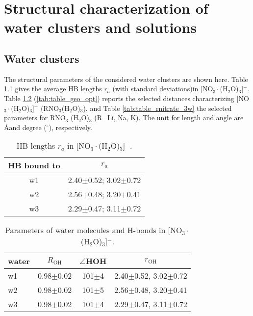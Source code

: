 \chapter{Structural characterization of water clusters and solutions}
\section{Water clusters}\label{structure_of_clusters}
The structural parameters of the considered water clusters are shown here.
Table \ref{tab:3_nitrate_bond_0} gives the average HB lengths $r_a$ (with standard deviations)in [NO$_3\cdot$(H$_2$O)$_3$]$^-$.  
Table \ref{tab:3w_nitrate} (\ref{tab:table_geo_opt}) reports the selected distances characterizing 
[NO$_3\cdot$(H$_2$O)$_3$]$^-$ (RNO$_3$(H$_2$O)$_3$), and Table \ref{tab:table_rnitrate_3w} the selected parameters for RNO$_3$   
 (H$_2$O)$_3$ (R=Li, Na, K).
The unit for length and angle are \AA and degree ($^\circ$), respectively.
% 
\begin{table}[!h]
\centering
\caption{\label{tab:3_nitrate_bond_0}%
HB lengths $r_a$ in [NO$_3\cdot$(H$_2$O)$_3$]$^-$.} %
\begin{tabular}{cc} \\\toprule
 HB bound to & \multicolumn{1}{c}{ $r_a$} \\
\hline
 w1 &2.40$\pm$0.52; 3.02$\pm$0.72 \\
 w2 &2.56$\pm$0.48; 3.20$\pm$0.41 \\
 w3 &2.29$\pm$0.47; 3.11$\pm$0.72
\end{tabular}
\end{table}
%
\begin{table}[!htbp]
\centering
\caption{\label{tab:3w_nitrate}%
Parameters of water molecules and H-bonds in [NO$_3\cdot$(H$_2$O)$_3$]$^-$.} %
\begin{tabular}{lccc}
water &$R_\text{OH}$ &$\angle$HOH & $r_\text{OH}$ \\
\hline
w1 &0.98$\pm$0.02 &101$\pm$4 & 2.40$\pm$0.52, 3.02$\pm$0.72 \\
w2 &0.98$\pm$0.02 &101$\pm$5 & 2.56$\pm$0.48, 3.20$\pm$0.41 \\
w3 &0.98$\pm$0.02 &101$\pm$4 & 2.29$\pm$0.47, 3.11$\pm$0.72
\end{tabular}
\end{table}
%
